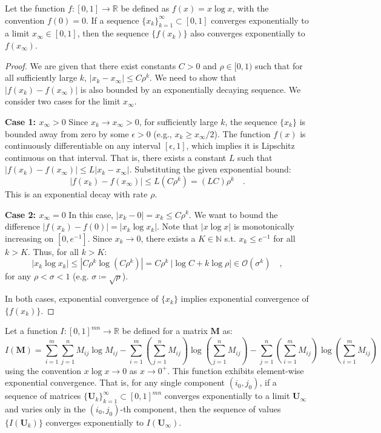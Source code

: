 \documentclass[../../main.tex]{subfiles}
\begin{document}
\begin{lemma}
Let the function $f: [0, 1] \to \mathbb{R}$ be defined as $f(x) = x \log x$, with the convention $f(0) = 0$. If a sequence $\{x_k\}_{k=1}^\infty \subset [0,1]$ converges exponentially to a limit $x_\infty \in [0,1]$, then the sequence $\{f(x_k)\}$ also converges exponentially to $f(x_\infty)$.
\end{lemma}
\vspace{-2.5em}
\begin{proof}
We are given that there exist constants $C > 0$ and $\rho \in [0, 1)$ such that for all sufficiently large $k$, $|x_k - x_\infty| \le C \rho^k$. We need to show that $|f(x_k) - f(x_\infty)|$ is also bounded by an exponentially decaying sequence. We consider two cases for the limit $x_\infty$.

\textbf{Case 1: $x_\infty > 0$}
Since $x_k \to x_\infty > 0$, for sufficiently large $k$, the sequence $\{x_k\}$ is bounded away from zero by some $\epsilon > 0$ (e.g., $x_k \ge x_\infty/2$). The function $f(x)$ is continuously differentiable on any interval $[\epsilon, 1]$, which implies it is Lipschitz continuous on that interval. That is, there exists a constant $L$ such that $|f(x_k) - f(x_\infty)| \le L |x_k - x_\infty|$.
Substituting the given exponential bound:
\[
|f(x_k) - f(x_\infty)| \le L (C \rho^k) = (LC) \rho^k \quad .
\]
This is an exponential decay with rate $\rho$.

\textbf{Case 2: $x_\infty = 0$}
In this case, $|x_k - 0| = x_k \le C \rho^k$. We want to bound the difference $|f(x_k) - f(0)| = |x_k \log x_k|$.
Note that $|x \log x|$ is monotonically increasing on $[0, e^{-1}]$. Since $x_k \to 0$, there exists a $K \in \mathbb{N}$ s.t. $x_k \leq e^{-1}$ for all $k > K$. Thus, for all $k > K$:
\[
    |x_k \log x_k| \leq |C \rho^k \log (C \rho^k)| = C \rho^k \ |\log C + k \log \rho| \in \mathcal{O}(\sigma^k) \quad ,
\]
for any $\rho < \sigma < 1$ (e.g. $\sigma \coloneqq \sqrt{\rho}$).

In both cases, exponential convergence of $\{x_k\}$ implies exponential convergence of $\{f(x_k)\}$.
\end{proof}

\begin{theorem}
Let a function $I: [0, 1]^{mn} \to \mathbb{R}$ be defined for a matrix $\bm{M}$ as:
\[
    I(\bm{M}) = \sum_{i=1}^m \sum_{j=1}^n M_{ij}\log M_{ij} - \sum_{i=1}^m \left(\sum_{j=1}^n M_{ij}\right)\log\left(\sum_{j=1}^n M_{ij}\right) - \sum_{j=1}^n \left(\sum_{i=1}^m M_{ij}\right)\log\left(\sum_{i=1}^m M_{ij}\right)
\]
using the convention $x \log x \to 0$ as $x \to 0^+$. This function exhibits element-wise exponential convergence. That is, for any single component $(i_0, j_0)$, if a sequence of matrices $\{\bm{U}_k\}_{k=1}^\infty \subset [0, 1]^{mn}$ converges exponentially to a limit $\bm{U}_\infty$ and varies only in the $(i_0, j_0)$-th component, then the sequence of values $\{I(\bm{U}_k)\}$ converges exponentially to $I(\bm{U}_\infty)$.
\end{theorem}
\end{document}
